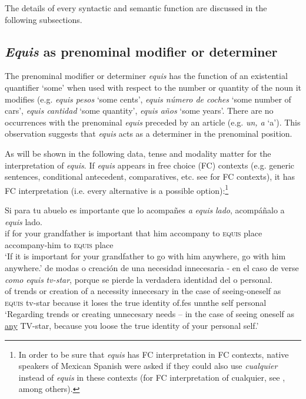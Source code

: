 \documentclass[output=paper]{langsci/langscibook}
\begin{document}
The details of every syntactic and semantic function are discussed in the following subsections.

\subsection{\textit{Equis} as prenominal modifier or determiner}\label{sec:kellert:2.1}
The prenominal modifier or determiner \textit{equis} has the function of an existential quantifier ‘some’ when used with respect to the number or quantity of the noun it modifies (e.g. \textit{equis pesos} ‘some cents’, \textit{equis número de coches} ‘some number of cars’, \textit{equis cantidad} ‘some quantity’, \textit{equis años} ‘some years’. There are no occurrences with the prenominal \textit{equis} preceded by an article (e.g. \textit{un, a} ‘a’). This observation suggests that \textit{equis} acts as a determiner in the prenominal position.

As will be shown in the following data, tense and modality matter for the interpretation of \textit{equis}. If \textit{equis} appears in free choice (FC) contexts (e.g. generic sentences, conditional antecedent, comparatives, etc. see \citealt{Aloni2010} for FC contexts), it has FC interpretation (i.e. every alternative is a possible option):\footnote{In order to be sure that \textit{equis} has FC interpretation in FC contexts, native speakers of Mexican Spanish were asked if they could also use \textit{cualquier} instead of \textit{equis} in these contexts (for FC interpretation of cualquier, see \citealt{AM2011}, among others).}

\ea\label{ex:kellert:9}
\gll Si para tu abuelo es importante que lo acompañes \textit{a} \textit{equis} \textit{lado}, acompáñalo a \textit{equis} lado.\\
if for your grandfather is important that him accompany to \textsc{equis} place accompany-him to \textsc{equis} place\\
\glt ‘If it is important for your grandfather to go with him anywhere, go with him anywhere.’
\ex 
\gll de modas o creación de una necesidad innecesaria - en el caso de verse \textit{como} \textit{equis} \textit{tv-star}, porque se pierde la verdadera identidad del o personal.\\
of trends or creation of a necessity innecesary {} in the case of seeing-oneself as \textsc{equis} tv-star because it	loses the true identity of.fes unnthe self personal\\
\glt ‘Regarding trends or creating unnecesary needs – in the case of seeing oneself as \underline{any} TV-star, because you loose the true identity of your personal self.’
\z
\end{document}
